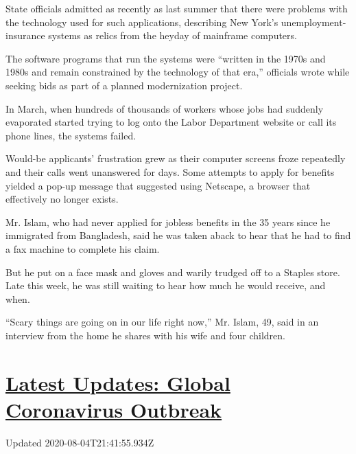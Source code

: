 State officials admitted as recently as last summer that there were
problems with the technology used for such applications, describing New
York's unemployment-insurance systems as relics from the heyday of
mainframe computers.

The software programs that run the systems were ``written in the 1970s
and 1980s and remain constrained by the technology of that era,''
officials wrote while seeking bids as part of a planned modernization
project.

In March, when hundreds of thousands of workers whose jobs had suddenly
evaporated started trying to log onto the Labor Department website or
call its phone lines, the systems failed.

Would-be applicants' frustration grew as their computer screens froze
repeatedly and their calls went unanswered for days. Some attempts to
apply for benefits yielded a pop-up message that suggested using
Netscape, a browser that effectively no longer exists.

Mr. Islam, who had never applied for jobless benefits in the 35 years
since he immigrated from Bangladesh, said he was taken aback to hear
that he had to find a fax machine to complete his claim.

But he put on a face mask and gloves and warily trudged off to a Staples
store. Late this week, he was still waiting to hear how much he would
receive, and when.

``Scary things are going on in our life right now,'' Mr. Islam, 49, said
in an interview from the home he shares with his wife and four children.

\hypertarget{latest-updates-global-coronavirus-outbreak}{%
\section{\texorpdfstring{\href{https://www.nytimes3xbfgragh.onion/2020/08/04/world/coronavirus-cases.html?action=click\&pgtype=Article\&state=default\&region=MAIN_CONTENT_1\&context=storylines_live_updates}{Latest
Updates: Global Coronavirus
Outbreak}}{Latest Updates: Global Coronavirus Outbreak}}\label{latest-updates-global-coronavirus-outbreak}}

Updated 2020-08-04T21:41:55.934Z

